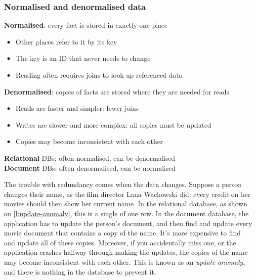 \begin{frame}
    \label{s:normalisation}
    \frametitle{Normalised and denormalised data}
    \textbf{Normalised}: every fact is stored in exactly one place
    \begin{itemize}
        \item Other places refer to it by its key
        \item The key is an ID that never needs to change
        \item Reading often requires joins to look up referenced data\\[1em]\pause
    \end{itemize}
    \textbf{Denormalised}: copies of facts are stored where they are needed for reads
    \begin{itemize}
        \item Reads are faster and simpler: fewer joins
        \item Writes are slower and more complex: all copies must be updated
        \item Copies may become inconsistent with each other\\[1em]\pause
    \end{itemize}
    \textbf{Relational} DBs: often normalised, can be denormalised\\
    \textbf{Document} DBs: often denormalised, can be normalised
\end{frame}
\label{l:normalisation}

The trouble with redundancy comes when the data changes.
Suppose a person changes their name, as the film director Lana Wachowski did: every credit on her movies should then show her current name.
In the relational database, as shown on \autoref{l:update-anomaly}, this is a single  of one row.
In the document database, the application has to update the person's document, and then find and update every movie document that contains a copy of the name.
It's more expensive to find and update all of these copies.
Moreover, if you accidentally miss one, or the application crashes halfway through making the updates, the copies of the name may become inconsistent with each other.
This is known as an \emph{update anomaly}, and there is nothing in the database to prevent it.

